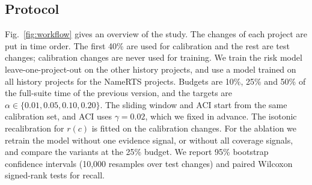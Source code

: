 \documentclass[conference]{IEEEtran}
\begin{document}
\subsection{Protocol}
Fig.~\ref{fig:workflow} gives an overview of the study. The changes of each project are put in time order. The first 40\% are used for calibration and the rest are test changes; calibration changes are never used for training. We train the risk model leave-one-project-out on the other history projects, and use a model trained on all history projects for the NameRTS projects. Budgets are 10\%, 25\% and 50\% of the full-suite time of the previous version, and the targets are $\alpha\in\{0.01,0.05,0.10,0.20\}$. The sliding window and ACI start from the same calibration set, and ACI uses $\gamma=0.02$, which we fixed in advance. The isotonic recalibration for $r(c)$ is fitted on the calibration changes. For the ablation we retrain the model without one evidence signal, or without all coverage signals, and compare the variants at the 25\% budget. We report 95\% bootstrap confidence intervals (10,000 resamples over test changes) and paired Wilcoxon signed-rank tests for recall.

\end{document}
